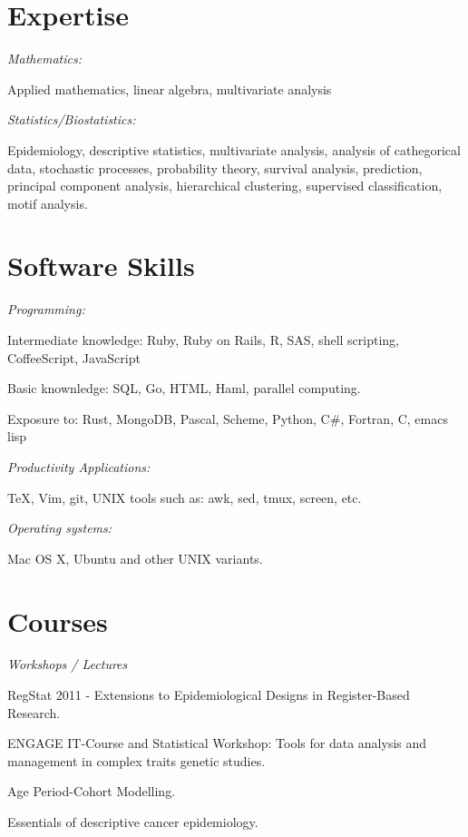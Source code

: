 %
%
\section{Expertise}
\textit{Mathematics:}
\begin{innerlist}
    \item Applied mathematics, linear algebra, multivariate analysis
\end{innerlist}

\halfblankline

\textit{Statistics/Biostatistics:}
\begin{innerlist}
    \item Epidemiology, descriptive statistics, multivariate analysis, analysis of cathegorical data, stochastic processes, probability theory, survival analysis, prediction, principal component analysis, hierarchical clustering, supervised classification, motif analysis.
\end{innerlist}

%
%
\section{Software Skills}
\textit{Programming:}
\begin{innerlist}
    \item Intermediate knowledge: Ruby, Ruby on Rails, R, SAS, shell scripting, CoffeeScript, JavaScript
    \item Basic knownledge: SQL, Go, HTML, Haml, parallel computing.
    \item Exposure to: Rust, MongoDB, Pascal, Scheme, Python, C\#, Fortran, C, emacs lisp
\end{innerlist}

\halfblankline

\textit{Productivity Applications:}
\begin{innerlist}
\item \TeX{}, Vim, git, UNIX tools such as: awk, sed, tmux, screen, etc.
\end{innerlist}

\halfblankline

\textit{Operating systems:}
\begin{innerlist}
    \item Mac OS X, Ubuntu and other UNIX variants.
\end{innerlist}


%
%
\section{Courses}
\textit{Workshops / Lectures}
\begin{innerlist}
    \item RegStat 2011 - Extensions to Epidemiological Designs in Register-Based Research.
    \item ENGAGE IT-Course and Statistical Workshop: Tools for data analysis and management in complex traits genetic studies.
    \item Age Period-Cohort Modelling.
    \item Essentials of descriptive cancer epidemiology.
\end{innerlist}

